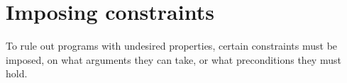 \newcommand{\framedhslinecorrect}[2]%
  {#1[#2]}

\newcommand{\framedhs}{\sethscode{framedhscode}}


\newenvironment{inlinehscode}%
  {\(\def\column##1##2{}%
   \let\>\undefined\let\<\undefined\let\\\undefined
   \newcommand\>[1][]{}\newcommand\<[1][]{}\newcommand\\[1][]{}%
   \def\fromto##1##2##3{##3}%
   \def\nextline{}}{\) }%

\newcommand{\inlinehs}{\sethscode{inlinehscode}}


\newenvironment{joincode}%
  {\let\orighscode=\hscode
   \let\origendhscode=\endhscode
   \def\endhscode{\def\hscode{\endgroup\def\@currenvir{hscode}\\}\begingroup}
   \orighscode\def\hscode{\endgroup\def\@currenvir{hscode}}}%
  {\origendhscode
   \global\let\hscode=\orighscode
   \global\let\endhscode=\origendhscode}%

\makeatother
\EndFmtInput
%

%
\makeatletter

\let\Varid\mathit
\let\Conid\mathsf

\def\commentbegin{\quad\{\ }
\def\commentend{\}}

\newcommand{\ty}[1]{\Conid{#1}}
\newcommand{\con}[1]{\Conid{#1}}
\newcommand{\id}[1]{\Varid{#1}}
\newcommand{\cl}[1]{\Varid{#1}}
\newcommand{\opsym}[1]{\mathrel{#1}}

\newcommand\Keyword[1]{\textbf{\textsf{#1}}}
\newcommand\Hide{\mathbin{\downarrow}}
\newcommand\Reveal{\mathbin{\uparrow}}




\makeatother
\EndFmtInput

\section{Imposing constraints}
\label{sec:constraints}

To rule out programs with undesired properties, certain constraints must be
imposed, on what arguments they can take, or what preconditions they must hold.

